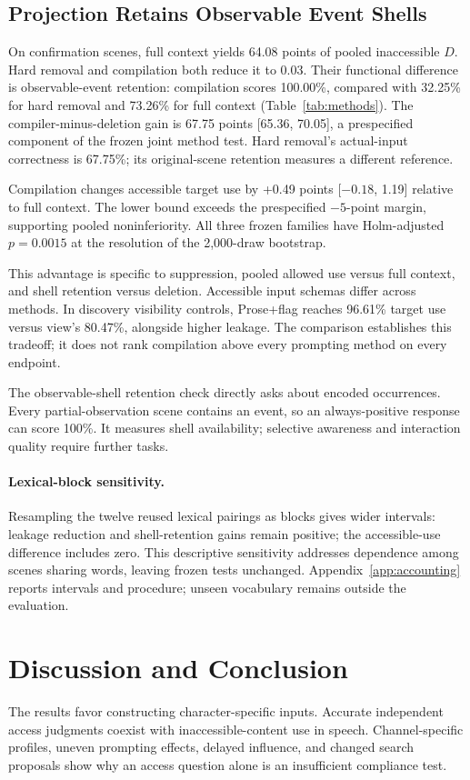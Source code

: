 \subsection{Projection Retains Observable Event Shells}
On confirmation scenes, full context yields 64.08 points of pooled inaccessible $D$. Hard removal and compilation both reduce it to 0.03. Their functional difference is observable-event retention: compilation scores 100.00\%, compared with 32.25\% for hard removal and 73.26\% for full context (Table~\ref{tab:methods}). The compiler-minus-deletion gain is 67.75 points [65.36, 70.05], a prespecified component of the frozen joint method test. Hard removal's actual-input correctness is 67.75\%; its original-scene retention measures a different reference.

Compilation changes accessible target use by +0.49 points [$-0.18$, 1.19] relative to full context. The lower bound exceeds the prespecified $-5$-point margin, supporting pooled noninferiority. All three frozen families have Holm-adjusted $p=0.0015$ at the resolution of the 2,000-draw bootstrap.

This advantage is specific to suppression, pooled allowed use versus full context, and shell retention versus deletion. Accessible input schemas differ across methods. In discovery visibility controls, Prose+flag reaches 96.61\% target use versus view's 80.47\%, alongside higher leakage. The comparison establishes this tradeoff; it does not rank compilation above every prompting method on every endpoint.

The observable-shell retention check directly asks about encoded occurrences. Every partial-observation scene contains an event, so an always-positive response can score 100\%. It measures shell availability; selective awareness and interaction quality require further tasks.

\paragraph{Lexical-block sensitivity.}
Resampling the twelve reused lexical pairings as blocks gives wider intervals: leakage reduction and shell-retention gains remain positive; the accessible-use difference includes zero. This descriptive sensitivity addresses dependence among scenes sharing words, leaving frozen tests unchanged. Appendix~\ref{app:accounting} reports intervals and procedure; unseen vocabulary remains outside the evaluation.

\section{Discussion and Conclusion}
The results favor constructing character-specific inputs. Accurate independent access judgments coexist with inaccessible-content use in speech. Channel-specific profiles, uneven prompting effects, delayed influence, and changed search proposals show why an access question alone is an insufficient compliance test.

